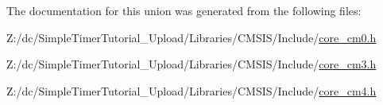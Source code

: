 The documentation for this union was generated from the following files\-:\begin{DoxyCompactItemize}
\item 
Z\-:/dc/\-Simple\-Timer\-Tutorial\-\_\-\-Upload/\-Libraries/\-C\-M\-S\-I\-S/\-Include/\hyperlink{core__cm0_8h}{core\-\_\-cm0.\-h}\item 
Z\-:/dc/\-Simple\-Timer\-Tutorial\-\_\-\-Upload/\-Libraries/\-C\-M\-S\-I\-S/\-Include/\hyperlink{core__cm3_8h}{core\-\_\-cm3.\-h}\item 
Z\-:/dc/\-Simple\-Timer\-Tutorial\-\_\-\-Upload/\-Libraries/\-C\-M\-S\-I\-S/\-Include/\hyperlink{core__cm4_8h}{core\-\_\-cm4.\-h}\end{DoxyCompactItemize}

